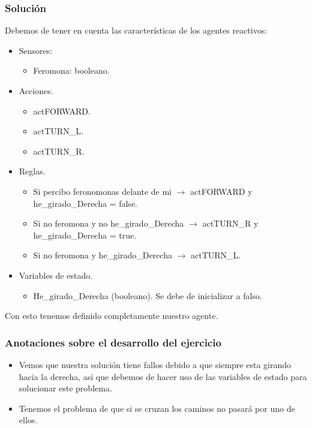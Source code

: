 \subsubsection*{Solución}
Debemos de tener en cuenta las características de los agentes reactivos:
\begin{itemize}
    \item Sensores:
    \begin{itemize}
        \item Feromona: booleano.
    \end{itemize}
    \item Acciones.
    \begin{itemize}
        \item actFORWARD.
        \item actTURN\_L.
        \item actTURN\_R.
    \end{itemize}
    \item Reglas.
    \begin{itemize}
        \item Si percibo feronomonas delante de mi $\rightarrow$ actFORWARD y he\_girado\_Derecha = false.
        \item Si no feromona y no he\_girado\_Derecha $\rightarrow$ actTURN\_R y he\_girado\_Derecha = true.
        \item Si no feromona y he\_girado\_Derecha $\rightarrow$ actTURN\_L.
    \end{itemize}
    \item Variables de estado.
    \begin{itemize}
        \item He\_girado\_Derecha (booleano). Se debe de inicializar a falso.
    \end{itemize}
\end{itemize}

Con esto tenemos definido completamente nuestro agente.

\subsubsection*{Anotaciones sobre el desarrollo del ejercicio}
\begin{itemize}
    \item Vemos que nuestra solución tiene fallos debido a que siempre esta girando hacia la derecha, así que debemos de hacer uso de las variables de estado para solucionar este problema.
    \item Tenemos el problema de que si se cruzan los caminos no pasará por uno de ellos.
\end{itemize}


